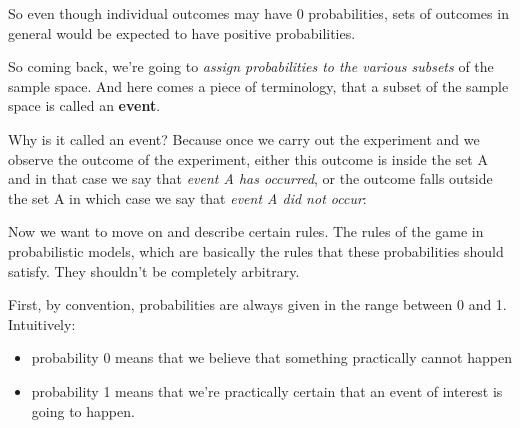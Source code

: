 \documentclass[pdftex, brazil, 12pt, twoside]{article}
\begin{document}
\begin{figure}[H]
  \begin{center}
  \end{center}
\end{figure}

So even though individual outcomes may have 0
probabilities, sets of outcomes in general would be
expected to have positive probabilities.

So coming back, we're going to \emph{assign probabilities to the
various subsets} of the sample space.
And here comes a piece of terminology, that a subset of
the sample space is called an \textbf{event}.

Why is it called an event?
Because once we carry out the experiment and we observe the
outcome of the experiment, either this outcome is inside
the set A and in that case we say that \emph{event A has occurred},
or the outcome falls outside the set A in which case we say
that \emph{event A did not occur}:

\begin{figure}[H]
  \begin{center}
  \end{center}
\end{figure}

Now we want to move on and describe certain rules.
The rules of the game in probabilistic models, which
are basically the rules that these
probabilities should satisfy.
They shouldn't be completely arbitrary.

First, by convention, probabilities are always given
in the range between 0 and 1. Intuitively:

\begin{itemize}[noitemsep]
\item probability 0 means that we believe that
  something practically cannot happen
\item probability 1 means that we're practically certain
  that an event of interest is going to happen.
\end{itemize}
\end{document}
